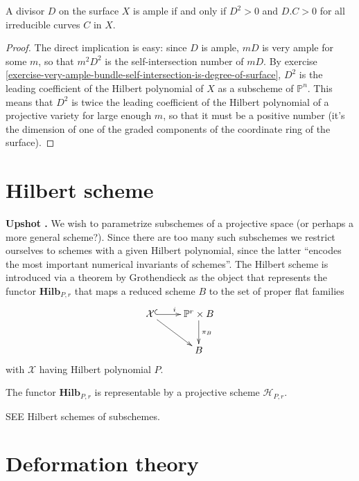 \begin{theorem}
\label{theorem-Nakai-Moishezon-criterion}
\begin{reference}
\cite[V, Theorem 1.10]{hart}
\end{reference}
A divisor $D$ on the surface $X$ is ample if and only if $D^2>0$ and $D.C>0$ for
all irreducible curves $C$ in $X$.
\end{theorem}

\begin{proof}
The direct implication is easy: since $D$ is ample,  $mD$ is very ample for some
$m$, so that $m^2D^2$ is the self-intersection number of $mD$. By exercise
\ref{exercise-very-ample-bundle-self-intersection-is-degree-of-surface},
 $D^2$ is the leading coefficient of the Hilbert polynomial of $X$ as a 
subscheme of $\mathbb{P}^n$. This means that $D^2$ is twice the leading
coefficient of the Hilbert polynomial of a projective variety for large enough
$m$, so that it must be a positive number (it's the dimension of one of the
graded components of the coordinate ring of the surface).
\end{proof}

\section{Hilbert scheme}
\label{section-Hilbert-scheme}

{\bf Upshot \cite[p. 6]{HarrMorr}.} 
We wish to parametrize subschemes of a projective space (or
perhaps a more general scheme?). Since there are too many such subschemes we
restrict ourselves to schemes with a given Hilbert polynomial, since the latter
``encodes the most important numerical invariants of schemes''. The Hilbert
scheme is introduced via a theorem by Grothendieck 
as the object that represents the functor $\mathbf{Hilb}_{P,r}$ 
that maps a reduced scheme $B$ to the
set of proper flat families
$$
\xymatrix{
\mathcal{X}\ar@{^{(}->}[r]^i\ar[rd]&\mathbb{P}^r \times B \ar[d]^{\pi_B}\\
& B
}
$$
with $\mathcal{X}$ having Hilbert polynomial $P$.

\begin{theorem}[Grothendieck, '66]
\label{theorem-Grothendieck}
The functor $\mathbf{Hilb}_{P,r}$ is representable by a projective scheme
$\mathcal{H}_{P,r}$.
\end{theorem}

SEE Hilbert schemes of subschemes.

\section{Deformation theory}
\label{section-deformation-theory}

